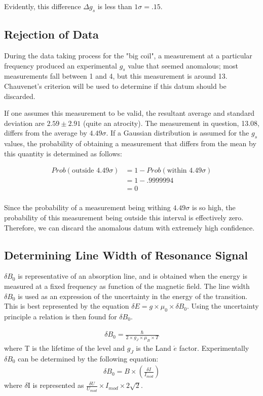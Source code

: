 \documentclass[a4paper]{article}
\begin{document}
Evidently, this difference $\Delta g_s$ is less than $1 \sigma = .15$.

\subsection{Rejection of Data}
\qq During the data taking process for the "big coil", a measurement
at a particular frequency produced an experimental $g_s$ value that
seemed anomalous; most measurements fall between 1 and 4, but this
measurement is around 13. Chauvenet's criterion will be used to
determine if this datum should be discarded.

\qq If one assumes this measurement to be valid, the resultant average
and standard deviation are $2.59 \pm 2.91$ (quite an atrocity). The
measurement in question, 13.08, differs from the average by $4.49
\sigma$. If a Gaussian distribution is assumed for the $g_s$ values,
the probability of obtaining a measurement that differs from the mean
by this quantity is determined as follows:

\begin{align*}
Prob(\text{outside }  4.49 \sigma) &= 1 - Prob(\text{within } 4.49 \sigma) \\
							  &= 1 -  .9999994 \\
							  &= 0 \\
\end{align*}

\qq Since the probability of a measurement being withing $4.49 \sigma$
is so high, the probability of this measurement being outside this
interval is effectively zero. Therefore, we can discard the anomalous
datum with extremely high confidence.

\subsection{Determining Line Width of Resonance Signal}
\qq $\delta B_0$ is representative of an absorption line, and is
obtained when the energy is measured at a fixed frequency as function
of the magnetic field. The line width $\delta B_0$ is used as an
expression of the uncertainty in the energy of the transition. This is
best represented by the equation $\delta E = g \times \mu_0 \times
\delta B_0$. Using the uncertainty principle a relation is then found
for $\delta B_0$.

\begin{align*}
\delta B_0 = \frac{\hbar}{2 \times g_J \times \mu_B \times T}
\end{align*}
where T is the lifetime of the level and $g_J$ is the Land $\acute{e}$
factor. Experimentally $\delta B_0$ can be determined by the following equation:
\begin{align*}
\delta B_0 = B \times \left( \frac{\delta I}{I_{mod}} \right)
\end{align*}
where $\delta$I is represented as $\frac{\delta U}{U_{mod}} \times  I_{mod} \times 2\sqrt{2}$.
\end{document}
